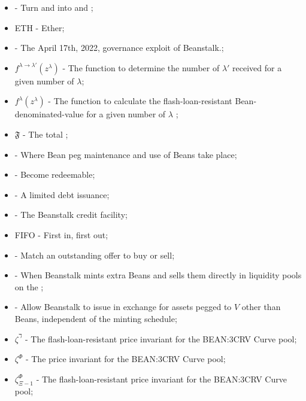 \documentclass[class=article, crop=false]{standalone}
\begin{document}
\begin{itemize}[topsep=0pt, itemsep=3pt,leftmargin=16pt]
    \item[]  - \hypertarget{ht80}{Turn  and  into  and };
    \item[] ETH - \hypertarget{ht81}{Ether};
    \item[]  - \hypertarget{ht82}{The April 17th, 2022, governance exploit of Beanstalk.};
    \item[] $f^{\lambda \rightarrow \lambda'}(z^{\lambda})$ - \hypertarget{ht83}{The function to determine the number of $\lambda'$ received for  a given number of $\lambda$};
    \item[] $f^{\lambda}(z^{\lambda})$ - \hypertarget{ht84}{The function to calculate the flash-loan-resistant Bean-denominated-value for a given number of $\lambda$ };
    \item[] $\mathfrak{F}$ - \hypertarget{ht85}{The total };
    \item[]  - \hypertarget{ht86}{Where Bean peg maintenance and use of Beans take place};
    \item[]  - \hypertarget{ht87}{Become redeemable};
    \item[]  - \hypertarget{ht88}{A limited debt issuance};
    \item[]  - \hypertarget{ht89}{The Beanstalk credit facility};
    \item[] FIFO - \hypertarget{ht89}{First in, first out};
    \item[]  - \hypertarget{ht90}{Match an outstanding offer to buy or sell};
    \item[]  - \hypertarget{ht91}{When Beanstalk mints extra Beans and sells them directly in liquidity pools on the };
    \item[]  - \hypertarget{ht93}{Allow Beanstalk to issue  in exchange for assets pegged to $V$ other than Beans, independent of the  minting schedule};
    \item[] $\zeta^{\daleth}$ - \hypertarget{ht94}{The flash-loan-resistant price invariant for the BEAN:3CRV Curve pool};
    \item[] $\zeta^{\Phi}$ - \hypertarget{ht95}{The price invariant for the BEAN:3CRV Curve pool};
    \item[] $\zeta^{\Phi}_{\Xi-1}$ - \hypertarget{ht96}{The flash-loan-resistant price invariant for the BEAN:3CRV Curve pool};

\end{itemize}
\end{document}
